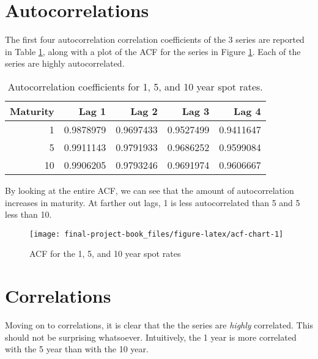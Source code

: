 \documentclass[openany]{book}
\theoremstyle{definition}
\theoremstyle{definition}
\theoremstyle{definition}
\theoremstyle{remark}
\begin{document}
\hypertarget{autocorrelations}{%
\section{Autocorrelations}\label{autocorrelations}}

The first four autocorrelation correlation coefficients of the 3 series
are reported in Table \ref{tab:acf-table}, along with a plot of the ACF
for the series in Figure \ref{fig:acf-chart}. Each of the series are
highly autocorrelated.

\small

\begin{table}[H]

\caption{\label{tab:acf-table}Autocorrelation coefficients for 1, 5, and 10 year spot rates.}
\centering
\begin{tabular}[t]{rrrrr}
\toprule
Maturity & Lag 1 & Lag 2 & Lag 3 & Lag 4\\
\midrule
1 & 0.9878979 & 0.9697433 & 0.9527499 & 0.9411647\\
5 & 0.9911143 & 0.9791933 & 0.9686252 & 0.9599084\\
10 & 0.9906205 & 0.9793246 & 0.9691974 & 0.9606667\\
\bottomrule
\end{tabular}
\end{table}

\normalsize

By looking at the entire ACF, we can see that the amount of
autocorrelation increases in maturity. At farther out lags, 1 is less
autocorrelated than 5 and 5 less than 10.

\small

\begin{figure}[H]

{\centering \texttt{[image: final-project-book\_files/figure-latex/acf-chart-1]} 

}

\caption{ACF for the 1, 5, and 10 year spot rates}\label{fig:acf-chart}
\end{figure}

\normalsize

\hypertarget{correlations}{%
\section{Correlations}\label{correlations}}

Moving on to correlations, it is clear that the the series are
\emph{highly} correlated. This should not be surprising whatsoever.
Intuitively, the 1 year is more correlated with the 5 year than with the
10 year.
\end{document}
